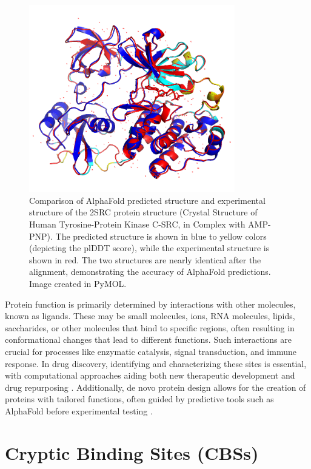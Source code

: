 \begin{figure}[ht]
    \centering
    \includegraphics[width=0.8\textwidth]{img/alphafold_vs_exp.png}
    \caption{Comparison of AlphaFold predicted structure and experimental structure of the 2SRC protein structure (Crystal Structure of Human Tyro\-sine-Protein Kinase C-SRC, in Complex with AMP-PNP). The predicted structure is shown in blue to yellow colors (depicting the plDDT score), while the experimental structure is shown in red. The two structures are nearly identical after the alignment, demonstrating the accuracy of AlphaFold predictions. Image created in PyMOL.}
    \label{fig:alphafold-vs-exp}
\end{figure}
\par

Protein function is primarily determined by interactions with other molecules, known as ligands. These may be small molecules, ions, RNA molecules, lipids, saccharides, or other molecules that bind to specific regions, often resulting in conformational changes that lead to different functions. Such interactions are crucial for processes like enzymatic catalysis, signal transduction, and immune response. In drug discovery, identifying and characterizing these sites is essential, with computational approaches aiding both new therapeutic development and drug repurposing \cite{konc2019binding}. Additionally, de novo protein design allows for the creation of proteins with tailored functions, often guided by predictive tools such as AlphaFold before experimental testing \cite{huang2016coming}.

\section{Cryptic Binding Sites (CBSs)}
\label{sec:binding-sites}

